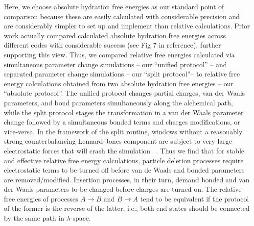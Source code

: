 \documentclass[journal=jctcce,manuscript=article]{achemso}
\begin{document}
Here, we choose absolute hydration free energies as our standard point of comparison 
because these are easily calculated with considerable precision \cite{duarte_ramos_matos_approaches_2017} %
and are considerably simpler to set up and implement than relative calculations.
Prior work actually compared calculated absolute hydration free energies across different codes with considerable success \cite{klimovich_predicting_2010} (see Fig 7 in reference), further supporting this view.
Thus, we compared relative free energies calculated via simultaneous parameter change simulations -- our ``unified protocol'' -- 
and separated parameter change simulations -- our ``split protocol''-- to relative free energy 
calculations obtained from two absolute hydration free energies -- our ``absolute protocol''.
The unified protocol changes partial charges, van der Waals parameters, and bond 
parameters simultaneously along the alchemical path, while the split protocol 
stages the transformation in a van der Waals parameter change followed by a simultaneous  
bonded terms and charges modifications, or vice-versa. In the framework 
of the split routine, windows without a reasonably strong counterbalancing Lennard-Jones 
component are subject to very large electrostatic forces that will crash the simulation
~\cite{pitera_comparison_2002, anwar_robust_2005}.  
Thus we find that for stable and effective relative free energy calculations, particle deletion processes
require electrostatic terms to be turned off before van de Waals and bonded parameters are removed/modified. 
Insertion processes, in their turn, demand bonded and van der Waals parameters to be changed before charges are turned on.
The relative free energies of processes $A \rightarrow B$ and $B \rightarrow A$ tend to be equivalent if the protocol of the former
is the reverse of the latter, i.e., both end states should be connected by the same path in $\lambda$-space. 
\end{document}
